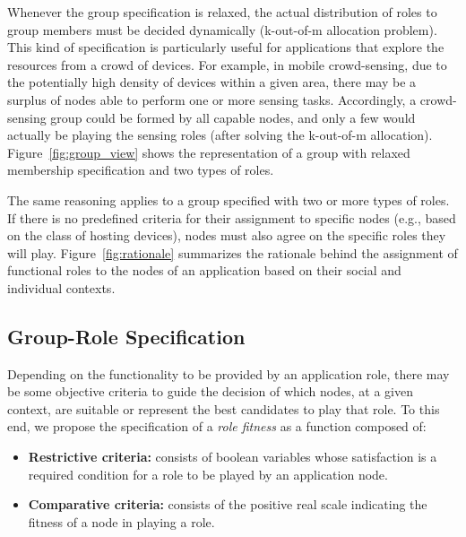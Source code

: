 Whenever the group specification is relaxed, the actual distribution of roles to group members must be decided dynamically (k-out-of-m allocation problem). This kind of specification is particularly useful for applications that explore the resources from a crowd of devices. For example, in mobile crowd-sensing, due to the potentially high density of devices within a given area, there may be a surplus of nodes able to perform one or more sensing tasks. Accordingly, a crowd-sensing group could be formed by all capable nodes, and only a few would actually be playing the sensing roles (after solving the k-out-of-m allocation). Figure~\ref{fig:group_view} shows the representation of a group with relaxed membership specification and two types of roles.

The same reasoning applies to a group specified with two or more types of roles. If there is no predefined criteria for their assignment to specific nodes (e.g., based on the class of hosting devices), nodes must also agree on the specific roles they will play. Figure~\ref{fig:rationale} summarizes the rationale behind the assignment of functional roles to the nodes of an application based on their social and individual contexts.


\subsection{Group-Role Specification}\label{sec:group_specification}


Depending on the functionality to be provided by an application role, there may be some objective criteria to guide the decision of which nodes, at a given context, are suitable or represent the best candidates to play that role. To this end, we propose the specification of a \textit{role fitness} as a function composed of:

\begin{itemize}
	
	\item \textbf{Restrictive criteria:} consists of boolean variables whose satisfaction is a required condition for a role to be played by an application node.
	
	\item \textbf{Comparative criteria:} consists of the positive real scale indicating the fitness of a node in playing a role.
	
\end{itemize}

